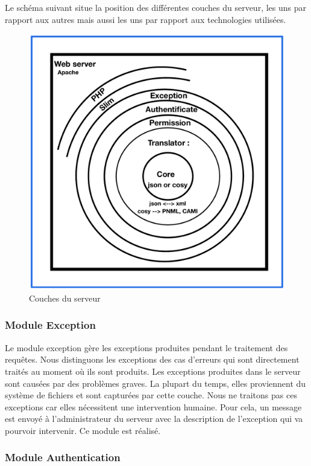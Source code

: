 \documentclass{report}
\begin{document}
Le schéma suivant situe la position des différentes couches du serveur, les uns par rapport aux autres mais aussi les 
uns par rapport aux technologies utilisées.
\begin{figure}[h!]
     \centering
     \includegraphics[scale=0.60]{img/server_couches.pdf}
     \caption{Couches du serveur}
\end{figure}

\subsubsection{Module Exception}

Le module exception gère les exceptions produites pendant le traitement des requêtes. Nous distinguons les 
exceptions des cas d'erreurs qui sont directement traités au moment où ils
sont produits. Les exceptions produites dans
le serveur sont causées par des problèmes graves. La plupart du temps, elles proviennent du système de fichiers et sont capturées par cette couche. Nous ne traitons pas ces exceptions car
elles nécessitent une intervention humaine. Pour cela, un message est envoyé à l'administrateur du serveur
avec la description de l'exception qui va pourvoir intervenir. Ce module est réalisé.

\subsubsection{Module Authentication}
\end{document}
